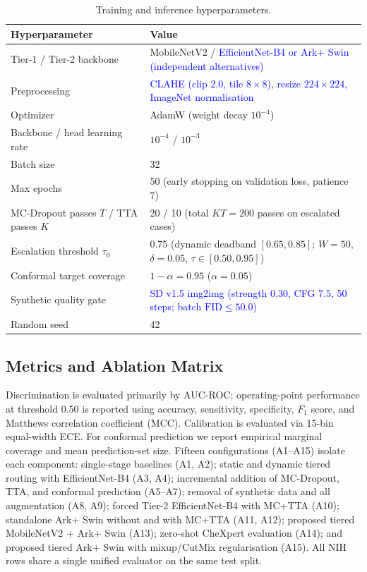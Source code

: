 \documentclass[diagnostics,article,submit,moreauthors]{Definitions/mdpi}
\newcommand{\rev}[1]{\textcolor{blue}{#1}}
\begin{document}
\begin{table}[H]
\caption{Training and inference hyperparameters.}\label{tab:hyper}
\begin{tabular}{@{}ll@{}}
\toprule
Hyperparameter & Value\\
\midrule
Tier-1 / Tier-2 backbone & MobileNetV2 / \rev{EfficientNet-B4 or Ark+ Swin (independent alternatives)}\\
Preprocessing & \rev{CLAHE (clip $2.0$, tile $8\times 8$), resize $224\times 224$, ImageNet normalisation}\\
Optimizer & AdamW (weight decay $10^{-4}$)\\
Backbone / head learning rate & $10^{-4}$ / $10^{-3}$\\
Batch size & 32\\
Max epochs & 50 (early stopping on validation loss, patience 7)\\
MC-Dropout passes $T$ / TTA passes $K$ & 20 / 10 (total $KT=200$ passes on escalated cases)\\
Escalation threshold $\tau_0$ & 0.75 (dynamic deadband $[0.65,0.85]$; $W=50$, $\delta=0.05$, $\tau\in[0.50,0.95]$)\\
Conformal target coverage & $1-\alpha=0.95$ ($\alpha=0.05$)\\
Synthetic quality gate & \rev{SD v1.5 img2img (strength $0.30$, CFG $7.5$, 50 steps; batch $\mathrm{FID}\le 50.0$)}\\
Random seed & 42\\
\bottomrule
\end{tabular}
\end{table}

\subsection{Metrics and Ablation Matrix}

Discrimination is evaluated primarily by AUC-ROC; operating-point performance at threshold $0.50$ is reported using accuracy, sensitivity, specificity, $F_1$ score, and Matthews correlation coefficient (MCC). Calibration is evaluated via 15-bin equal-width ECE. For conformal prediction we report empirical marginal coverage and mean prediction-set size. Fifteen configurations (A1--A15) isolate each component: single-stage baselines (A1, A2); static and dynamic tiered routing with EfficientNet-B4 (A3, A4); incremental addition of MC-Dropout, TTA, and conformal prediction (A5--A7); removal of synthetic data and all augmentation (A8, A9); forced Tier-2 EfficientNet-B4 with MC+TTA (A10); standalone Ark+ Swin without and with MC+TTA (A11, A12); proposed tiered MobileNetV2 + Ark+ Swin (A13); zero-shot CheXpert evaluation (A14); and proposed tiered Ark+ Swin with mixup/CutMix regularisation (A15). All NIH rows share a single unified evaluator on the same test split.
\end{document}
